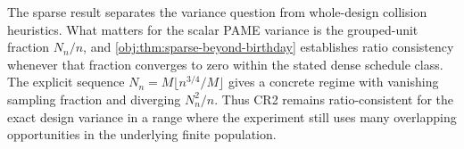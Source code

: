 The sparse result separates the variance question from whole-design collision heuristics. What matters for the scalar PAME variance is the grouped-unit fraction \(N_n/n\), and \cref{obj:thm:sparse-beyond-birthday} establishes ratio consistency whenever that fraction converges to zero within the stated dense schedule class. The explicit sequence \(N_n=M\lfloor n^{3/4}/M\rfloor\) gives a concrete regime with vanishing sampling fraction and diverging \(N_n^2/n\). Thus CR2 remains ratio-consistent for the exact design variance in a range where the experiment still uses many overlapping opportunities in the underlying finite population.
